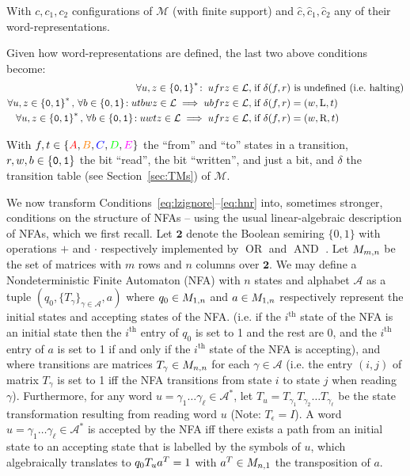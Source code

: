 With $c, c_1, c_2$ configurations of $\mathcal{M}$ (with finite support) and $\hat{c}, \hat{c}_1, \hat{c}_2$ any of their word-representations.


Given how word-representations are defined, the last two above conditions become:
\begin{align}
    \forall u,z\in\left\{\texttt{0},\texttt{1}\right\}^*\!: \; ufrz \in \mathcal{L},\;                                                             & \text{if $\delta(f,r)$ is undefined (i.e.~halting)} \label{eq:h0}
    \\
    \forall u,z\in\left\{\texttt{0},\texttt{1}\right\}^*,\,\forall b \in \left\{\texttt{0},\texttt{1}\right\}\!: utbwz \in \mathcal{L} \implies ubfrz \in \mathcal{L},\;     & \text{if $\delta(f,r) = (w,\text{L},t)$} \label{eq:hnl}
    \\
    \forall u,z\in\left\{\texttt{0},\texttt{1}\right\}^*,\,\forall b \in \left\{\texttt{0},\texttt{1}\right\}\!: u w t z \in \mathcal{L} \implies u f r z \in \mathcal{L},\; & \text{if $\delta(f,r) = (w,\text{R},t)$} \label{eq:hnr}
\end{align}

With $f,t \in \{\stateA,\stateB,\stateC,\stateD,\stateE\}$ the ``from'' and ``to'' states in a transition, $r,w,b \in \left\{\texttt{0},\texttt{1}\right\}$ the bit ``read'', the bit ``written'', and just a bit, and $\delta$ the transition table (see Section~\ref{sec:TMs}) of $\mathcal{M}$.


We now transform Conditions~\eqref{eq:lzignore}–\eqref{eq:hnr} into, sometimes stronger, conditions on the structure of NFAs -- using the usual linear-algebraic description of NFAs, which we first recall. Let $\mathbf{2}$ denote the Boolean semiring $\{0,1\}$ with operations $+$ and $\cdot$ respectively implemented by $\operatorname{OR}$ and $\operatorname{AND}$ \cite{CUNINGHAMEGREEN1991251}. Let $M_{m,n}$ be the set of matrices with $m$ rows and $n$ columns over $\mathbf{2}$. We may define a Nondeterministic Finite Automaton (NFA) with $n$ states and alphabet $\mathcal{A}$ as a tuple $(q_0, \{T_\gamma\}_{\gamma \in \mathcal{A}}, a)$ where $q_0 \in M_{1,n}$ and $a \in M_{1,n}$ respectively represent the initial states and accepting states of the NFA. (i.e. if the $i^\text{th}$ state of the NFA is an initial state then the $i^\text{th}$ entry of $q_0$ is set to 1 and the rest are 0, and the $i^\text{th}$ entry of $a$ is set to 1 if and only if the $i^\text{th}$ state of the NFA is accepting), and where transitions are matrices $T_\gamma\in M_{n,n}$ for each $\gamma\in\mathcal{A}$ (i.e. the entry $(i,j)$ of matrix $T_\gamma$ is set to 1 iff the NFA transitions from state $i$ to state $j$ when reading $\gamma$). Furthermore, for any word $u=\gamma_1\dots\gamma_\ell \in \mathcal{A}^*$, let $T_u = T_{\gamma_1} T_{\gamma_2} \dots T_{\gamma_\ell}$ be the state transformation resulting from reading word $u$ (Note: $T_\epsilon = I$). A word $u=\gamma_1\dots\gamma_\ell \in \mathcal{A}^*$ is accepted by the NFA iff there exists a path from an initial state to an accepting state that is labelled by the symbols of $u$, which algebraically translates to $q_0 T_u a^{T} = 1$ with $a^{T} \in M_{n,1}$ the transposition of $a$.

